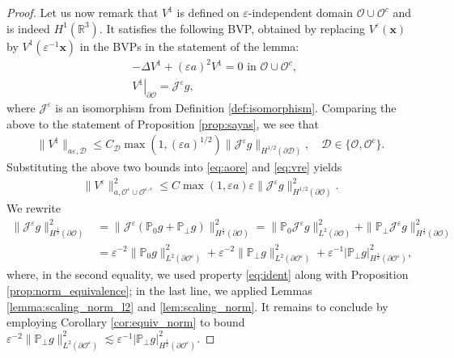 \documentclass[]{article}
\numberwithin{equation}{section}
\numberwithin{theorem}{section}
\numberwithin{lemma}{section}
\numberwithin{corollary}{section}
\numberwithin{proposition}{section}
\numberwithin{definition}{section}
\newcommand{\re}{\varepsilon}
\renewcommand{\O}{\mathcal{O}}
\newcommand{\bO}{\partial\O}
\renewcommand{\vec}{\boldsymbol}
\begin{document}
\begin{appendices}
\begin{proof}
			Let us now remark that $V^1$ is defined on $\re$-independent domain $\O\cup\O^{c}$ and is indeed  $H^1(\mathbb{R}^3)$. It satisfies the following BVP, obtained by replacing $V^{\re}(\vec{x})$ by $V^{1}(\re^{-1}\vec{x})$ in the BVPs in the statement of the lemma:
			\begin{align*}%
				&-\Delta V^1+(\varepsilon a)^2 V^1=0 \text{ in }\O\cup\O^c, \\
				&\left.V^1\right|_{\partial\O}=\mathcal{J}^{\re}g,
			\end{align*}
			where $\mathcal{J}^{\re}$ is an isomorphism from Definition \ref{def:isomorphism}. 
			Comparing the above to the statement of Proposition \ref{prop:sayas}, we see that 
			\begin{align*}%
				\|V^1\|_{a\re,\mathcal{D}}\leq C_{\mathcal{D}}\max(1,(\re a)^{1/2})\|\mathcal{J}^{\re}g\|_{H^{1/2}(\partial \mathcal{D})},\quad \mathcal{D} \in \{\O, \O^c\}.
			\end{align*}
			Substituting the above two bounds into \eqref{eq:aore} and \eqref{eq:vre} yields 
			\begin{align*}%
				\|V^{\re}\|_{a,\O^{\re}\cup\O^{\re,c}}^2\leq C\max(1, \re a)\re  \|\mathcal{J}^{\re}g\|_{H^{1/2}(\partial\O)}^2.
			\end{align*} 
			We rewrite  
			\begin{align*}
				\| \mathcal{J}^{\re} g \|^2_{H^{\frac{1}{2}}(\bO)} &= \|  \mathcal{J}^{\re}(\mathbb{P}_0g + \mathbb{P}_{\perp} g) \|^2_{H^{\frac{1}{2}}(\bO)}  = \| \mathbb{P}_0  \mathcal{J}^{\re}g\|^2_{L^2(\bO)} + \| \mathbb{P}_{\perp}  \mathcal{J}^{\re}g\|^2_{H^{\frac{1}{2}}(\bO)} \\
				& = \re^{-2} \| \mathbb{P}_0 g\|^2_{L^2(\bO^{\re})} + \re^{-2}\| \mathbb{P}_{\perp} g\|^2_{L^2(\bO^{\re})}+ \re^{-1} | \mathbb{P}_{\perp} g|^2_{H^{\frac{1}{2}}(\bO^{\re})},
			\end{align*}
			where, in the second equality, we used property \eqref{eq:ident} along with Proposition \ref{prop:norm_equivalence}; in the last line, we applied Lemmas \ref{lemma:scaling_norm_l2} and \ref{lem:scaling_norm}. It remains to conclude by employing Corollary \ref{cor:equiv_norm} to bound $\re^{-2}\| \mathbb{P}_{\perp} g\|^2_{L^2(\bO^{\re})}\lesssim \re^{-1}|\mathbb{P}_{\perp}g|^2_{H^{\frac{1}{2}}(\partial\O^{\re})}$. 

\end{proof}
\end{appendices}
\end{document}
